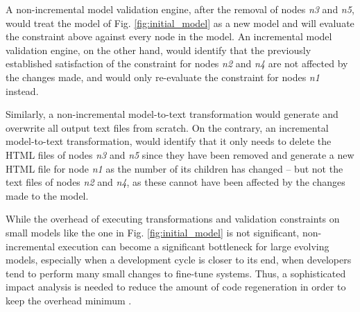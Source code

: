 \documentclass[sigconf]{acmart}
\begin{document}
A non-incremental model validation engine, after the removal of nodes \emph{n3} and \emph{n5}, would treat the model of Fig. \ref{fig:initial_model} as a new model and will evaluate the constraint above against every node in the model. An incremental model validation engine, on the other hand, would identify that the previously established satisfaction of the constraint for nodes \emph{n2} and \emph{n4} are not affected by the changes made, and would only re-evaluate the constraint for nodes \emph{n1} instead. 

Similarly, a non-incremental model-to-text transformation would generate and overwrite all output text files from scratch. On the contrary, an incremental model-to-text transformation, would identify that it only needs to delete the HTML files of nodes \emph{n3} and \emph{n5} since they have been removed and generate a new HTML file for node \emph{n1} as the number of its children has changed -- but not the text files of nodes \emph{n2} and \emph{n4}, as these cannot have been affected by the changes made to the model.

While the overhead of executing transformations and validation constraints on small models like the one in Fig. \ref{fig:initial_model} is not significant, non-incremental execution can become a significant bottleneck for large evolving models, especially when a development cycle is closer to its end, when developers tend to perform many small changes to fine-tune systems. Thus, a sophisticated impact analysis is needed to reduce the amount of code regeneration in order to keep the overhead minimum \cite{selic2003pragmatics}.  
\end{document}
